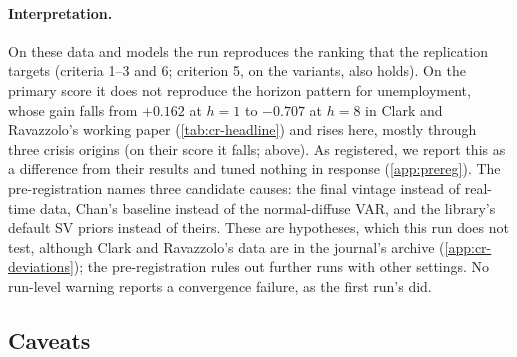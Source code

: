 \paragraph{Interpretation.}
On these data and models the run reproduces the ranking that the replication targets (criteria 1--3
and 6; criterion 5, on the variants, also holds). On the primary score it does not reproduce the
horizon pattern for unemployment, whose gain falls from $+0.162$ at $h = 1$ to $-0.707$ at $h = 8$
in Clark and Ravazzolo's working paper (\cref{tab:cr-headline}) and rises here, mostly through three
crisis origins (on their score it falls; above). %
As registered, we report this as a difference from their results and tuned nothing in response
(\cref{app:prereg}). The pre-registration names three candidate causes: the final vintage instead
of real-time data, Chan's  baseline instead of the normal-diffuse VAR, and the
library's default SV priors instead of theirs. These are hypotheses, which this run does not test,
although Clark and Ravazzolo's data are in the journal's archive (\cref{app:cr-deviations}); the
pre-registration rules out further runs with other settings. %
No run-level warning reports a convergence failure, as the first run's did. %

\subsection{Caveats}\label{sec:replication-caveats}

